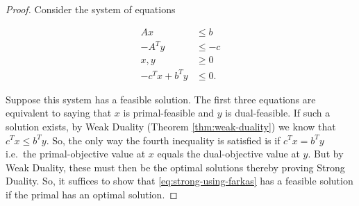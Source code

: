 \documentclass[
]{book}
\theoremstyle{definition}
\theoremstyle{definition}
\theoremstyle{definition}
\theoremstyle{definition}
\theoremstyle{remark}
\begin{document}
\begin{proof}
Consider the system of equations

\begin{equation}
\begin{split}
Ax & \le b \\
-A^T y & \le -c \\ 
x, y & \ge 0 \\
-c^T x + b^T y & \le 0.
\end{split}
\label{eq:strong-using-farkas}
\end{equation}

Suppose this system has a feasible solution. The first three equations are equivalent to saying that \(x\) is primal-feasible and \(y\) is dual-feasible. If such a solution exists, by Weak Duality (Theorem \ref{thm:weak-duality}) we know that \(c^T x \le b^T y\). So, the only way the fourth inequality is satisfied is if \(c^T x = b^T y\) i.e.~the primal-objective value at \(x\) equals the dual-objective value at \(y\). But by Weak Duality, these must then be the optimal solutions thereby proving Strong Duality. So, it suffices to show that \eqref{eq:strong-using-farkas} has a feasible solution if the primal has an optimal solution.


\end{proof}
\end{document}
